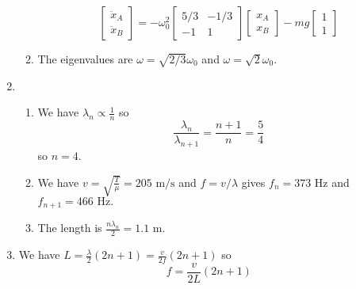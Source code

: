 \documentclass{article}
\begin{document}
\begin{enumerate}
\begin{enumerate}
\begin{equation}
            \begin{bmatrix}
                \ddot{x}_A \\ \ddot{x}_B
            \end{bmatrix} = -\omega_0^2\begin{bmatrix}
                5/3 & -1/3  \\ 
                -1 & 1
            \end{bmatrix}\begin{bmatrix}
                x_A \\ x_B
            \end{bmatrix} - mg\begin{bmatrix}
                1 \\ 1
            \end{bmatrix}
        \end{equation}
        \item The eigenvalues are $\omega = \sqrt{2/3}\omega_0$ and $\omega = \sqrt{2}\omega_0$.
    \end{enumerate}
    \item \begin{enumerate}
        \item We have $\lambda_n \propto \frac{1}{n}$ so 
        \begin{equation}
            \frac{\lambda_n}{\lambda_{n+1}}=\frac{n+1}{n}=\frac{5}{4}
        \end{equation}
        so $n=4$.
        \item We have $v=\sqrt{\frac{T}{\mu}}=205\text{ m/s}$ and $f=v/\lambda$ gives $f_n=373\text{ Hz}$ and $f_{n+1}=466\text{ Hz}.$
        \item The length is $\frac{n\lambda_n}{2} = 1.1\text{ m}.$
    \end{enumerate}
    \item We have $L=\frac{\lambda}{2}\left(2n+1\right) = \frac{v}{2f}\left(2n+1\right)$
    so 
    \begin{equation}
        f = \frac{v}{2L}\left(2n+1\right)
    \end{equation}
\end{enumerate}
\end{document}
